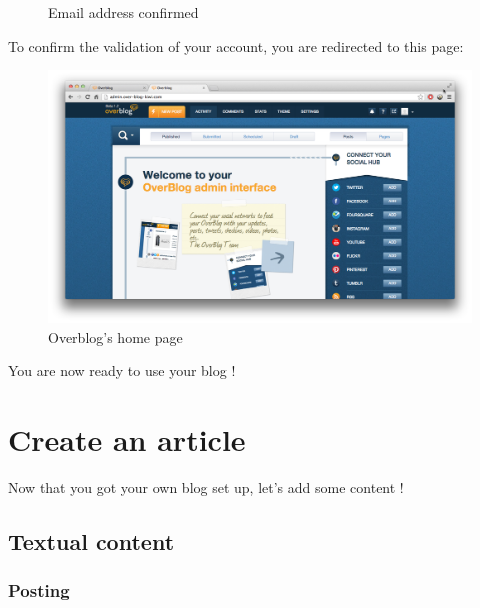 \documentclass[a4paper,10pt]{article}
\begin{document}
\begin{enumerate}
\begin{figure}[H]
    \caption{Email address confirmed}
\end{figure}
To confirm the validation of your account, you are redirected to this page:
\begin{figure}[H]
    \center
	\includegraphics[width=13cm]{Images/overblogPage.png}
    \caption{Overblog's home page}
\end{figure}
You are now ready to use your blog !
\end{enumerate}


\newpage
\section{Create an article}

Now that you got your own blog set up, let's add some content ! 

\subsection{Textual content}

\subsubsection{Posting}
\end{document}
